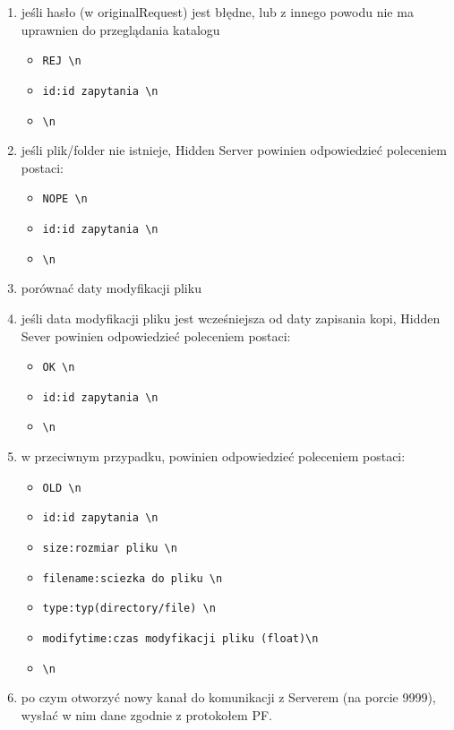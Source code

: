 \documentclass[a4paper,notitlepage]{article}
\begin{document}
\begin{enumerate}
    \item jeśli hasło (w originalRequest) jest błędne, lub z innego powodu nie ma uprawnien do przeglądania katalogu
    \begin{itemize}   
        \item \texttt{REJ \textbackslash n}
        \item \texttt{id:id zapytania \textbackslash n}
        \item \texttt{\textbackslash n}
    \end{itemize}
    \item jeśli plik/folder nie istnieje, Hidden Server powinien odpowiedzieć poleceniem postaci:
    \begin{itemize}   
        \item \texttt{NOPE \textbackslash n}
        \item \texttt{id:id zapytania \textbackslash n}
        \item \texttt{\textbackslash n}
    \end{itemize}
    \item porównać daty modyfikacji pliku 
    \item jeśli data modyfikacji pliku jest wcześniejsza od daty zapisania kopi, Hidden Sever powinien odpowiedzieć poleceniem postaci:
    \begin{itemize}
        \item \texttt{OK \textbackslash n}
        \item \texttt{id:id zapytania \textbackslash n}
        \item \texttt{\textbackslash n}
    \end{itemize}
    \item w przeciwnym przypadku, powinien odpowiedzieć poleceniem postaci:
    \begin{itemize}
        \item \texttt{OLD \textbackslash n}
        \item \texttt{id:id zapytania \textbackslash n}
        \item \texttt{size:rozmiar pliku \textbackslash n}
        \item \texttt{filename:sciezka do pliku \textbackslash n}
        \item \texttt{type:typ(directory/file) \textbackslash n}
        \item \texttt{modifytime:czas modyfikacji pliku (float)\textbackslash n}
        \item \texttt{\textbackslash n}
    \end{itemize}
    \item po czym otworzyć nowy kanał do komunikacji z Serverem (na porcie 9999), wysłać w nim dane zgodnie z protokołem PF.
\end{enumerate}
\end{document}
